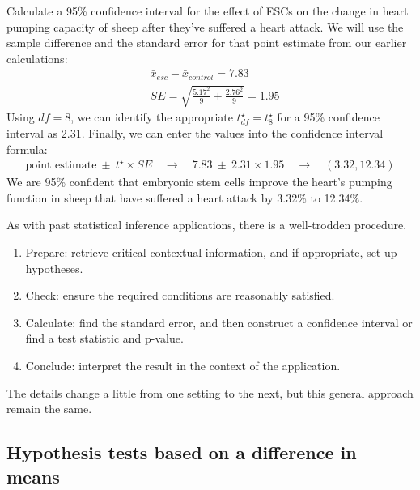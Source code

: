 \begin{examplewrap}
\begin{nexample}{Calculate a 95\% confidence interval for the effect of ESCs on the change in heart pumping capacity of sheep after they've suffered a heart attack.}
We will use the sample difference and the standard error for that point estimate from our earlier calculations:
\begin{align*}
& \bar{x}_{esc} - \bar{x}_{control} = 7.83 \\
& SE = \sqrt{\frac{5.17^2}{9} + \frac{2.76^2}{9}} = 1.95
\end{align*}
Using $df = 8$, we can identify the appropriate $t^{\star}_{df} = t^{\star}_{8}$ for a 95\% confidence interval as 2.31. Finally, we can enter the values into the confidence interval formula:
\begin{align*}
\text{point estimate} \ \pm\ t^{\star} \times SE
\quad\rightarrow\quad
7.83 \ \pm\ 2.31\times 1.95 \quad\rightarrow\quad (3.32, 12.34)
\end{align*}
We are 95\% confident that embryonic stem cells improve the heart's pumping function in sheep that have suffered a heart attack by 3.32\% to 12.34\%.
\end{nexample}
\end{examplewrap}


\noindent%
As with past statistical inference applications,
there is a well-trodden procedure.
\begin{enumerate}
\item Prepare: retrieve critical contextual information,
    and if appropriate, set up hypotheses.
\item Check: ensure the required conditions are reasonably
    satisfied.
\item Calculate: find the standard error, and then construct
    a confidence interval or find a test statistic and p-value.
\item Conclude: interpret the result in the context of the
    application.
\end{enumerate}
The details change a little from one setting to the next,
but this general approach remain the same.


\subsection{Hypothesis tests based on a difference in means}

